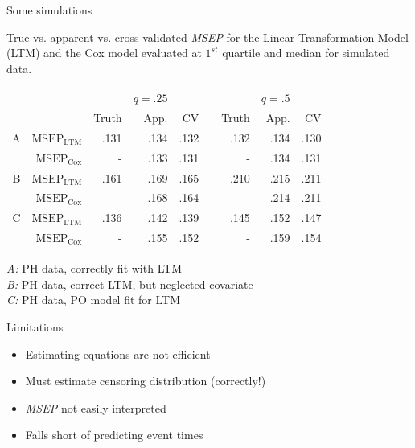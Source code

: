 \documentclass[11pt]{beamer}
\begin{document}
\begin{frame}{Some simulations}


{True vs. apparent vs. cross-validated \textsl{MSEP} for the Linear
Transformation Model (LTM) and the Cox model evaluated at $1^{st}$
quartile and median for simulated data.}


\begin{small}
\begin{center}
\begin{tabular}{rrrrrrrrr}
  \hline
   & & & $q={.25}$  & & & & $q={.5}$ & \\ \cline{3-5} \cline{7- 9} 
 & & Truth & App. & CV &   &Truth & App. &CV  \\   \hline
A & $\text{MSEP}_{\text{LTM}}$ &  .131 & .134& .132  &   & .132 & .134 & .130  \\
      & $\text{MSEP}_{\text{Cox}}$ &     - & .133 & .131 &   & - & .134 & .131  \\
\textcolor{brick}{B} & $\text{MSEP}_{\text{LTM}}$ & \textcolor{brick}{
.161} & .169& .165  &   & \textcolor{brick}{.210} & .215 & .211  \\
      & $\text{MSEP}_{\text{Cox}}$ &     - & .168 & .164 &   & - & .214 & .211  \\
C & $\text{MSEP}_{\text{LTM}}$ &  .136 & .142& .139  &   & .145 & .152 & .147   \\
      & $\text{MSEP}_{\text{Cox}}$ &     - & .155 & .152 &   & - & .159 & .154  \\
\hline
\end{tabular}
\end{center}
 
 \hspace{1in} \textsl{A:}  PH data, correctly fit with LTM\\
  \hspace{1in} \textsl{\textcolor{brick}{B:}}  PH data, correct LTM, but neglected covariate \\
  \hspace{1in} \textsl{C:}  PH data, PO model fit for LTM

\end{small}



\end{frame}


\begin{frame}{Limitations}

\begin{itemize}
  \item Estimating equations are not efficient

  \item Must estimate censoring distribution (correctly!)

  \item \textsl{MSEP} not easily interpreted

  \item Falls short of predicting event times

\end{itemize}

\end{frame}
\end{document}
